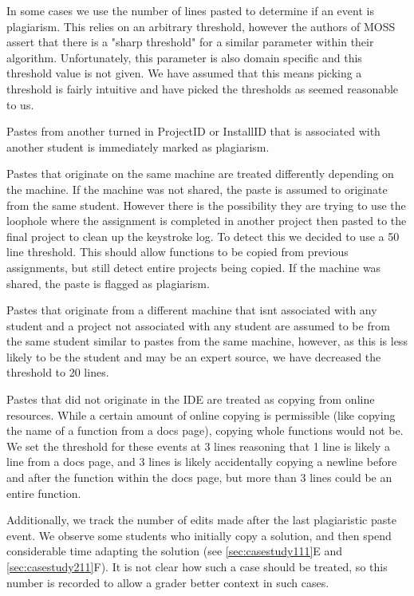 \documentclass[10pt]{article}
\newcommand{\installID}{InstallID\xspace}
\newcommand{\projectID}{ProjectID\xspace}
\begin{document}
In some cases we use the number of lines pasted to determine if an event is plagiarism.  This relies on an arbitrary threshold, however the authors of MOSS assert that there is a "sharp threshold" for a similar parameter within their algorithm\cite{moss}.  Unfortunately, this parameter is also domain specific and this threshold value is not given.  We have assumed that this means picking a threshold is fairly intuitive and have picked the thresholds as seemed reasonable to us.

Pastes from another turned in \projectID or \installID that is associated with another student is immediately marked as plagiarism.  

Pastes that originate on the same machine are treated differently depending on the machine.  If the machine was not shared, the paste is assumed to originate from the same student. However there is the possibility they are trying to use the loophole where the assignment is completed in another project then pasted to the final project to clean up the keystroke log.  To detect this we decided to use a 50 line threshold.  This should allow functions to be copied from previous assignments, but still detect entire projects being copied.   If the machine was shared, the paste is flagged as plagiarism.

Pastes that originate from a different machine that isnt associated with any student and a project not associated with any student are assumed to be from the same student similar to pastes from the same machine, however, as this is less likely to be the student and may be an expert source, we have decreased the threshold to 20 lines. 

Pastes that did not originate in the IDE are treated as copying from online resources.  While a certain amount of online copying is permissible (like copying the name of a function from a docs page), copying whole functions would not be.  We set the threshold for these events at 3 lines reasoning that 1 line is likely a line from a docs page, and 3 lines is likely accidentally copying a newline before and after the function within the docs page, but more than 3 lines could be an entire function.

Additionally, we track the number of edits made after the last plagiaristic paste event.  We observe some students who initially copy a solution, and then spend considerable time adapting the solution (see \ref{sec:casestudy111}E and \ref{sec:casestudy211}F).  It is not clear how such a case should be treated, so this number is recorded to allow a grader better context in such cases.  
\end{document}
